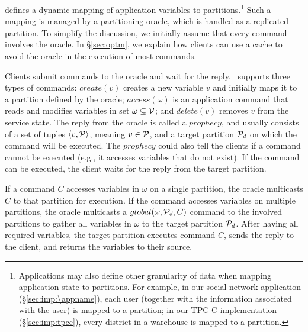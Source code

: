 \dynastar defines a dynamic mapping of application variables to partitions.\footnote{Applications may also define other granularity of data when mapping application state to partitions. For example, in our social network application (\S\ref{sec:imp:\appname}), each user (together with the information associated with the user) is mapped to a partition; in our TPC-C implementation (\S\ref{sec:imp:tpcc}), every district in a warehouse is mapped to a partition.}
Such a mapping is managed by a partitioning oracle, which is handled as a replicated partition.
To simplify the discussion, we initially assume that every command involves the oracle.
In \S\ref{sec:optm}, we explain how clients can use a cache to avoid the oracle in the execution of most commands.


Clients submit commands to the oracle and wait for the reply. 
\dynastar\ supports three types of commands:
$create(v)$ creates a new variable $v$ and initially maps it to a partition defined by the oracle;
$access(\omega)$ is an application command that reads and modifies variables in set $\omega \subseteq \mathcal{V}$; and
$delete(v)$ removes $v$ from the service state.
The reply from the oracle is called a $prophecy$, and usually 
consists of a set of tuples $\langle v, \mathcal{P} \rangle$, meaning 
$v \in \mathcal{P}$, and a target partition $\mathcal{P}_d$ on which the command 
will be executed. The $prophecy$ could also tell the clients 
if a command cannot be executed (e.g., it accesses 
variables that do not exist). If the command can be executed, 
the client waits for the reply from the target partition.

If a command $C$ accesses variables in $\omega$ on a single partition, 
the oracle multicasts $C$ to that partition for execution. If the command 
accesses variables on multiple partitions, the oracle multicasts a 
$global(\omega,\mathcal{P}_d, C)$ command to the involved partitions to gather 
all variables in $\omega$ to the target partition $\mathcal{P}_d$. After having all 
required variables, the target partition executes command $C$, 
sends the reply to the client, and returns the variables to their source. 

